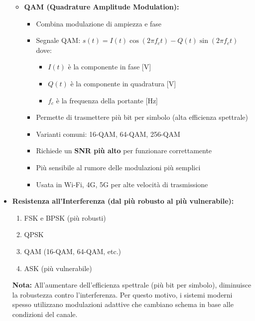 \begin{itemize}
\begin{itemize}
        \item \textbf{QAM (Quadrature Amplitude Modulation):}
            \begin{itemize}
                \item Combina modulazione di ampiezza e fase
                \item Segnale QAM: $s(t) = I(t)\cos(2\pi f_c t) - Q(t)\sin(2\pi f_c t)$ dove:
                    \begin{itemize}
                        \item $I(t)$ è la componente in fase [\si{V}]
                        \item $Q(t)$ è la componente in quadratura [\si{V}]
                        \item $f_c$ è la frequenza della portante [\si{Hz}]
                    \end{itemize}
                \item Permette di trasmettere più bit per simbolo (alta efficienza spettrale)
                \item Varianti comuni: 16-QAM, 64-QAM, 256-QAM
                \item Richiede un \textbf{SNR più alto} per funzionare correttamente
                \item Più sensibile al rumore delle modulazioni più semplici
                \item Usata in Wi-Fi, 4G, 5G per alte velocità di trasmissione
            \end{itemize}
    \end{itemize}

    \item \textbf{Resistenza all'Interferenza (dal più robusto al più vulnerabile):}
    \begin{enumerate}
        \item FSK e BPSK (più robusti)
        \item QPSK
        \item QAM (16-QAM, 64-QAM, etc.)
        \item ASK (più vulnerabile)
    \end{enumerate}
    
    \textbf{Nota:} All'aumentare dell'efficienza spettrale (più bit per simbolo), diminuisce la robustezza contro l'interferenza. Per questo motivo, i sistemi moderni spesso utilizzano modulazioni adattive che cambiano schema in base alle condizioni del canale.


\end{itemize}
